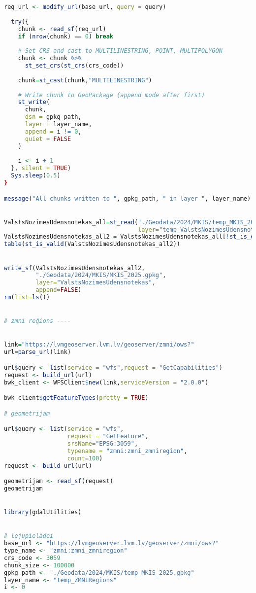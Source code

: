\documentclass[
]{book}
\begin{document}
\begin{lstlisting}[language=R]
  req_url <- modify_url(base_url, query = query)
  
  try({
    chunk <- read_sf(req_url)
    if (nrow(chunk) == 0) break
    
    # Set CRS and cast to MULTILINESTRING, POINT, MULTIPOLYGON
    chunk <- chunk %>%
      st_set_crs(st_crs(crs_code))
    
    chunk=st_cast(chunk,"MULTILINESTRING")
    
    # Write chunk to GeoPackage (append mode after first)
    st_write(
      chunk, 
      dsn = gpkg_path,
      layer = layer_name,
      append = i != 0,
      quiet = FALSE
    )
    
    i <- i + 1
  }, silent = TRUE)
  Sys.sleep(0.5)
}

message("All chunks written to ", gpkg_path, " in layer ", layer_name)


ValstsNozimesUdensnotekas_all=st_read("./Geodata/2024/MKIS/temp_MKIS_2025.gpkg",
                                      layer="temp_ValstsNozimesUdensnotekas")
ValstsNozimesUdensnotekas_all2 = ValstsNozimesUdensnotekas_all[!st_is_empty(ValstsNozimesUdensnotekas_all),,drop=FALSE] # 0
table(st_is_valid(ValstsNozimesUdensnotekas_all2))


write_sf(ValstsNozimesUdensnotekas_all2,
         "./Geodata/2024/MKIS/MKIS_2025.gpkg",
         layer="ValstsNozimesUdensnotekas",
         append=FALSE)
rm(list=ls())


# zmni reģions ----


link="https://lvmgeoserver.lvm.lv/geoserver/zmni/ows?"
url=parse_url(link)

url$query <- list(service = "wfs",request = "GetCapabilities")
request <- build_url(url)
bwk_client <- WFSClient$new(link,serviceVersion = "2.0.0")

bwk_client$getFeatureTypes(pretty = TRUE)

# geometrijam

url$query <- list(service = "wfs",
                  request = "GetFeature",
                  srsName="EPSG:3059",
                  typename = "zmni:zmni_zmniregion",
                  count=100)
request <- build_url(url)

geometrijam <- read_sf(request)
geometrijam


library(gdalUtilities)


# lejupielādei
base_url <- "https://lvmgeoserver.lvm.lv/geoserver/zmni/ows?"
type_name <- "zmni:zmni_zmniregion"
crs_code <- 3059
chunk_size <- 100000
gpkg_path <- "./Geodata/2024/MKIS/temp_MKIS_2025.gpkg"
layer_name <- "temp_ZMNIRegions"
i <- 0


\end{lstlisting}
\end{document}

